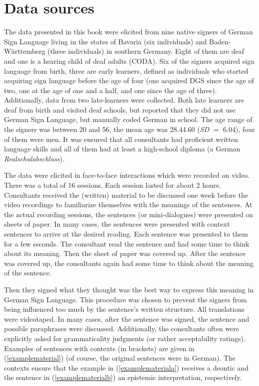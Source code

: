 
\section{Data sources}\label{methods}
The data presented in this book were elicited from nine native signers of German Sign Language living in the states of Bavaria (six individuals) and Baden-Württemberg (three individuals) in southern Germany. Eight of them are deaf and one is a hearing child of deaf adults (CODA). Six of the signers acquired sign language from birth, three are early learners, defined as individuals who started acquiring sign language before the age of four (one acquired DGS since the age of two, one at the age of one and a half, and one since the age of three). Additionally, data from two late-learners were collected. Both late learners are deaf from birth and visited deaf schools, but reported that they did not use German Sign Language, but manually coded German in school. The age range of the signers was between 20 and 56, the mean age was 28.44.60 (\textit{SD} $=$ 6.04), four of them were men. It was ensured that all consultants had proficient written language skills and all of them had at least a high-school diploma (a German \textit{Realschulabschluss}). 



The data were elicited in face-to-face interactions which were recorded on video. There was a total of 16 sessions. Each session lasted for about 2 hours. Consultants received the (written) material to be discussed one week before the video recordings to familiarize themselves with the meanings of the sentences. At the actual recording sessions, the sentences (or mini-dialogues) were presented on sheets of paper. In many cases, the sentences were presented with context sentences to arrive at the desired reading. Each sentence was presented to them for a few seconds. The consultant read the sentence and had some time to think about its meaning. Then the sheet of paper was covered up. After the sentence was covered up, the consultants again had some time to think about the meaning of the sentence. 

Then they signed what they thought was the best way to express this meaning in German Sign Language. This procedure was chosen to prevent the  signers  from  being  influenced  too  much  by  the  sentence's  written  structure. All translations were videotaped. In many cases, after the sentence was signed, the sentence and possible paraphrases were discussed. Additionally, the  consultants often were explicitly asked for grammaticality judgments (or rather acceptability ratings). Examples of sentences with contexts (in brackets) are given in (\ref{examplematerial}) (of course, the original sentences were in German). The contexts ensure that the example in (\ref{examplemateriala}) receives a deontic and the sentence in (\ref{examplematerialb}) an epistemic interpretation, respectively.

